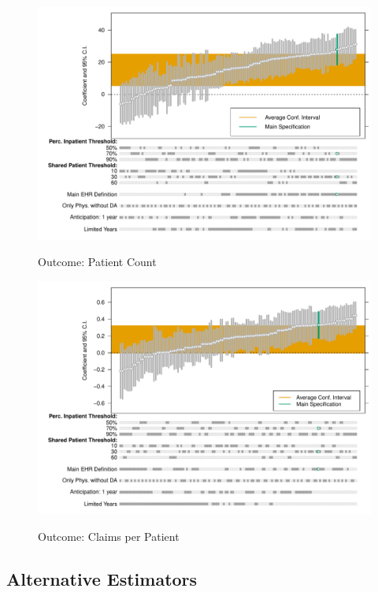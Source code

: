 \documentclass[12pt]{article}
\begin{document}
\begin{figure}[ht]
    \centering
    \caption{Outcome: Patient Count}
    \includegraphics[scale=.6]{Objects/patient_chart.pdf}
    \label{fig:pat_chart}
\end{figure}

\begin{figure}[ht]
    \centering
    \caption{Outcome: Claims per Patient}
    \includegraphics[scale=.6]{Objects/claim_per_patient_chart.pdf}
    \label{fig:cpp_chart}
\end{figure}



\subsection{Alternative Estimators}\label{app:estimators}
\end{document}
